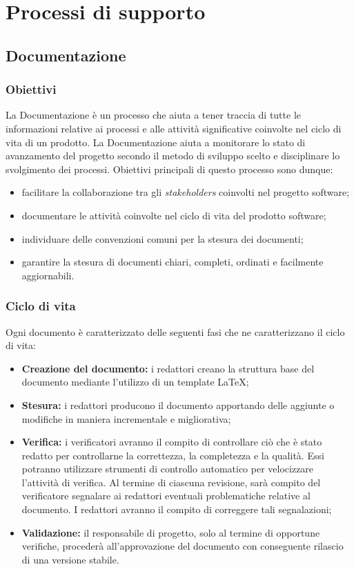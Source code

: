 \section{Processi di supporto}
  \subsection{Documentazione}
  \subsubsection{Obiettivi}
  La Documentazione è un processo che aiuta a tener traccia di tutte le informazioni relative ai processi e alle attività significative coinvolte nel ciclo di vita di un prodotto. La Documentazione aiuta a monitorare lo stato di avanzamento del progetto secondo il metodo di sviluppo scelto e disciplinare lo svolgimento dei processi. Obiettivi principali di questo processo sono dunque:
  \begin{itemize}
  	\item facilitare la collaborazione tra gli \textit{stakeholders\glo} coinvolti nel progetto software;
  	\item documentare le attività coinvolte nel ciclo di vita del prodotto software;
  	\item individuare delle convenzioni comuni per la stesura dei documenti;
  	\item garantire la stesura di documenti chiari, completi, ordinati e facilmente aggiornabili.
  \end{itemize}
  \subsubsection{Ciclo di vita}
  Ogni documento è caratterizzato delle seguenti fasi che ne caratterizzano il ciclo di vita:
	\begin{itemize}
		\item \textbf{Creazione del documento:} i redattori creano la struttura base del documento mediante l'utilizzo di un template \LaTeX;
		\item \textbf{Stesura:} i redattori producono il documento apportando delle aggiunte o modifiche in maniera incrementale e migliorativa;
		\item \textbf{Verifica:} i verificatori avranno il compito di controllare ciò che è stato redatto per controllarne la correttezza, la completezza e la qualità. Essi potranno utilizzare strumenti di controllo automatico per velocizzare l'attività di verifica. Al termine di ciascuna revisione, sarà compito del verificatore segnalare ai redattori eventuali problematiche relative al documento. I redattori avranno il compito di correggere tali segnalazioni;
		\item \textbf{Validazione:} il responsabile di progetto, solo al termine di opportune verifiche, procederà all'approvazione del documento con conseguente rilascio di una versione stabile.
	\end{itemize}
